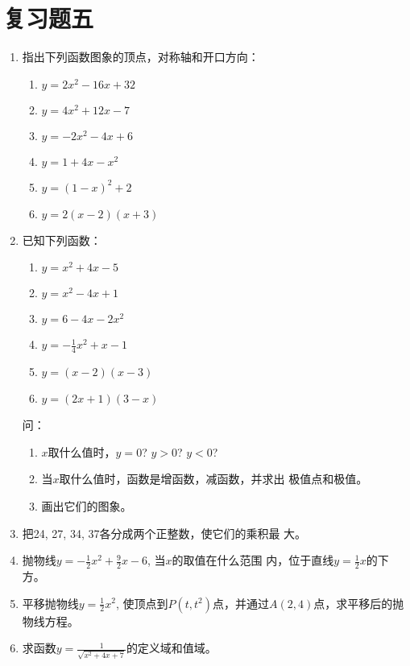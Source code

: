\section*{复习题五}
\begin{enumerate}
    \item 指出下列函数图象的顶点，对称轴和开口方向：
\begin{multicols}{2}
\begin{enumerate}
    \item $y=2x^2-16x+32$
    \item $y=4x^2+12x-7$
    \item $y=-2x^2-4x+6$
    \item $y=1+4x-x^2$
    \item $y=(1-x)^2+2$
    \item $y=2(x-2)(x+3)$
\end{enumerate}
\end{multicols}
   \item  已知下列函数：
\begin{multicols}{2}
\begin{enumerate}
\item $y=x^2+4x-5$
\item $y=x^2-4x+1$
\item $y=6-4x-2x^2$
\item $y=-\frac{1}{4}x^2+x-1$
\item $y=(x-2)(x-3)$
\item $y=(2x+1)(3-x)$
\end{enumerate}
\end{multicols}
   问： \begin{enumerate}
       \item $x$取什么值时，$y=0$? $y>0$? $y<0$?
       \item 当$x$取什么值时，函数是增函数，减函数，并求出
   极值点和极值。
   \item 画出它们的图象。
   \end{enumerate}
\item 把24, 27, 34, 37各分成两个正整数，使它们的乘积最
大。
\item 抛物线$y=-\frac{1}{2}x^2+\frac{9}{2}x-6$, 当$x$的取值在什么范围
内，位于直线$y=\frac{1}{2}x$的下方。
\item 平移抛物线$y=\frac{1}{2}x^2$, 使顶点到$P(t,t^2)$点，并通过$A(2,
4)$点，求平移后的抛物线方程。


\item 求函数$y=\frac{1}{\sqrt{x^2+4x+7}}$的定义域和值域。


\end{enumerate}
